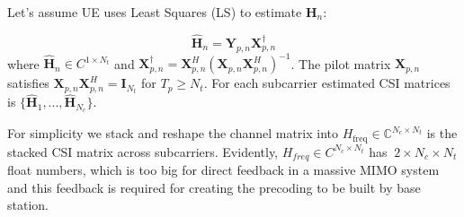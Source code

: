 \documentclass[lettersize,journal]{IEEEtran}
\begin{document}
Let's assume UE uses Least Squares (LS) to estimate \begin{math} \textbf{H}_{n} \end{math}:


\begin{equation}
	\hat{\textbf{H}}_{n}=\textbf{Y}_{p,n}\textbf{X}^{\dag}_{p,n}
\end{equation}
where 
\begin{math}
	\hat{\textbf{H}}_{n} \in C^{1\times N_{t}} 
\end{math} and
 \begin{math} \textbf{X}_{p,n}^{\dag}= \textbf{X}^{H}_{p,n}(\textbf{X}_{p,n}\textbf{X}^{H}_{p,n})^{-1} \end{math}.
 The pilot matrix \(\mathbf{X}_{p,n}\) satisfies \(\mathbf{X}_{p,n} \mathbf{X}_{p,n}^H = \mathbf{I}_{N_t}\) for \(T_p \geq N_t\).
For each subcarrier estimated CSI matrices is 
\begin{math}
	\{  \hat{\textbf{H}}_{1},...,\hat{\textbf{H}}_{N_{c}} \}
\end{math}.




For simplicity we stack and reshape the channel matrix into
\(H_{\text{freq}} \in \mathbb{C}^{N_c \times N_t}\) is the stacked CSI matrix across subcarriers.
Evidently, \begin{math} H_{freq} \in C^{N_{c}\times N_{t}}\end{math} has \begin{math}\ 2\times N_{c}\times N_{t}\end{math} float numbers, which is too big for direct feedback in a massive MIMO system and this feedback is required for creating
the precoding to be built by base station.
\end{document}
